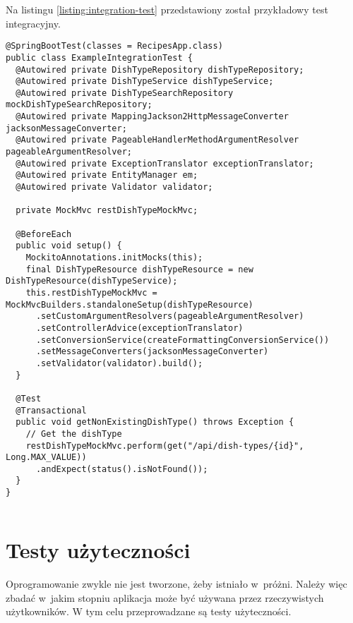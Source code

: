 \par
Na listingu \ref{listing:integration-test} przedstawiony został przykładowy test integracyjny.

\noindent\hspace{.075\textwidth}\begin{minipage}{.85\textwidth}
\begin{verbatim}
@SpringBootTest(classes = RecipesApp.class)
public class ExampleIntegrationTest {
  @Autowired private DishTypeRepository dishTypeRepository;
  @Autowired private DishTypeService dishTypeService;
  @Autowired private DishTypeSearchRepository mockDishTypeSearchRepository;
  @Autowired private MappingJackson2HttpMessageConverter jacksonMessageConverter;
  @Autowired private PageableHandlerMethodArgumentResolver pageableArgumentResolver;
  @Autowired private ExceptionTranslator exceptionTranslator;
  @Autowired private EntityManager em;
  @Autowired private Validator validator;

  private MockMvc restDishTypeMockMvc;

  @BeforeEach
  public void setup() {
    MockitoAnnotations.initMocks(this);
    final DishTypeResource dishTypeResource = new DishTypeResource(dishTypeService);
    this.restDishTypeMockMvc = MockMvcBuilders.standaloneSetup(dishTypeResource)
      .setCustomArgumentResolvers(pageableArgumentResolver)
      .setControllerAdvice(exceptionTranslator)
      .setConversionService(createFormattingConversionService())
      .setMessageConverters(jacksonMessageConverter)
      .setValidator(validator).build();
  }

  @Test
  @Transactional
  public void getNonExistingDishType() throws Exception {
    // Get the dishType
    restDishTypeMockMvc.perform(get("/api/dish-types/{id}", Long.MAX_VALUE))
      .andExpect(status().isNotFound());
  }
}
\end{verbatim}
\begin{lstlisting}[caption={Przykładowy test integracyjny \source{\ownwork}}, label={listing:integration-test}]
\end{lstlisting}
\end{minipage}

\section{Testy użyteczności}

Oprogramowanie zwykle nie jest tworzone, żeby istniało w~próżni.
Należy więc zbadać w~jakim stopniu aplikacja może być używana przez rzeczywistych użytkowników.
W tym celu przeprowadzane są testy użyteczności\cite{book:testowanie-i-jakosc-oprogramowania}.

